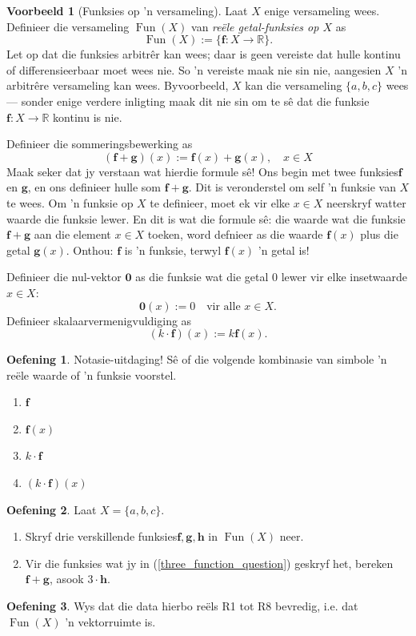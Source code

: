 \documentclass[a4paper,11pt]{book}
\theoremstyle{definition}
\newtheorem{exercise}{Oefening}
\newtheorem{example_environment}{Voorbeeld}[chapter]
\newcommand{\be}{\begin{equation}}
\newcommand{\ee}{\end{equation}}
\newcommand{\ve}[1]{\mathbf{#1}}
\newenvironment{example}
	{
		\begin{oframed}
		\begin{example_environment}
	}
	{
		\end{example_environment}
		\end{oframed}
	}
\DeclareMathOperator{\Fun}{Fun}
\begin{document}
\begin{example}[Funksies op 'n versameling] Laat $X$ enige versameling
	wees. Definieer die versameling $\Fun(X)$ van \emph{ re{\"e}le
	getal-funksies op $X$} as
	\be
	\Fun(X) := \{ \mathbf{f} : X \rightarrow \mathbb{R} \}.
	\ee
	Let op dat die funksies arbitr{\^e}r kan wees; daar is geen vereiste
	dat hulle kontinu of differensieerbaar moet wees nie. So 'n vereiste
	maak nie sin nie, aangesien $X$ 'n arbitr{\^e}re versameling kan wees.
	Byvoorbeeld, $X$ kan die versameling $\{a, b, c\}$ wees --- sonder
	enige verdere inligting maak dit nie sin om te s{\^e} dat die funksie
	$\mathbf{f} : X \rightarrow \mathbb{R}$ kontinu is nie.

	Definieer die sommeringsbewerking as
	\be
	(\mathbf{f} + \mathbf{g}) (x) := \mathbf{f}(x) + \mathbf{g}(x), \quad x
	\in X
	\ee
	Maak seker dat jy verstaan wat hierdie formule s{\^e}! Ons begin met
	twee funksies$\mathbf{f}$ en $\mathbf{g}$, en ons definieer hulle som
	$\mathbf{f} + \mathbf{g}$. Dit is veronderstel om self 'n funksie van
	$X$ te wees. Om 'n funksie op $X$ te definieer, moet ek vir elke $x \in
	X$ neerskryf watter waarde die funksie lewer. En dit is wat die formule
	s{\^e}: die waarde wat die funksie $\mathbf{f} + \mathbf{g}$ aan die
	element $x \in X$ toeken, word defnieer as die waarde $\mathbf{f}(x)$
	plus die getal $\mathbf{g}(x)$. Onthou: $\mathbf{f}$ is 'n funksie,
	terwyl $\mathbf{f}(x)$ 'n getal is!

	Definieer die nul-vektor $\mathbf{0}$ as die funksie wat die getal $0$
	lewer vir elke insetwaarde $x \in X$:
	\be
	\ve{0} (x) := 0 \quad \mbox{vir alle $x \in X$.}
	\ee
	Definieer skalaarvermenigvuldiging as
	\be
	(k \cdot \mathbf{f})(x) := k \mathbf{f}(x).
	\ee
	\begin{exercise} Notasie-uitdaging! S{\^e} of die volgende kombinasie
		van
		simbole 'n re{\"e}le waarde of 'n funksie voorstel.
		\begin{enumerate}
			\item $\mathbf{f}$
			\item $\mathbf{f}(x)$
			\item $k \cdot \mathbf{f}$
			\item $(k \cdot \mathbf{f})(x)$
		\end{enumerate}
	\end{exercise}

	\begin{exercise} Laat $X = \{a, b, c\}$.
		\begin{enumerate}
			\item \label{three_function_question}Skryf drie verskillende
				funksies$\mathbf{f}, \mathbf{g},
				\mathbf{h}$ in $\Fun(X)$ neer.
			\item Vir die funksies wat jy in
				(\ref{three_function_question}) geskryf het, bereken
				$\mathbf{f} + \mathbf{g}$, asook $3 \cdot \mathbf{h}$.
		\end{enumerate}
	\end{exercise}

	\begin{exercise} Wys dat die data hierbo re{\"e}ls R1 tot R8 bevredig,
		i.e. dat $\Fun(X)$ 'n vektorruimte is.
	\end{exercise}
\end{example}
\end{document}
